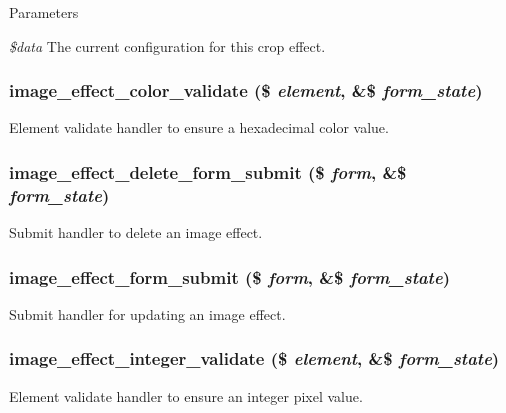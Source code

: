 \begin{DoxyParams}{Parameters}
\item[{\em \$data}]The current configuration for this crop effect. \end{DoxyParams}
\hypertarget{image_8admin_8inc_a2c063ffc86288da6ffc7ff2aa1fe5248}{
\subsubsection[{image\_\-effect\_\-color\_\-validate}]{\setlength{\rightskip}{0pt plus 5cm}image\_\-effect\_\-color\_\-validate (\$ {\em element}, \/  \&\$ {\em form\_\-state})}}
\label{image_8admin_8inc_a2c063ffc86288da6ffc7ff2aa1fe5248}
Element validate handler to ensure a hexadecimal color value. \hypertarget{image_8admin_8inc_aa77e4be504f72cab81b144a57a377427}{
\subsubsection[{image\_\-effect\_\-delete\_\-form\_\-submit}]{\setlength{\rightskip}{0pt plus 5cm}image\_\-effect\_\-delete\_\-form\_\-submit (\$ {\em form}, \/  \&\$ {\em form\_\-state})}}
\label{image_8admin_8inc_aa77e4be504f72cab81b144a57a377427}
Submit handler to delete an image effect. \hypertarget{image_8admin_8inc_aab999018d03bcbfde679bb79edcb4e34}{
\subsubsection[{image\_\-effect\_\-form\_\-submit}]{\setlength{\rightskip}{0pt plus 5cm}image\_\-effect\_\-form\_\-submit (\$ {\em form}, \/  \&\$ {\em form\_\-state})}}
\label{image_8admin_8inc_aab999018d03bcbfde679bb79edcb4e34}
Submit handler for updating an image effect. \hypertarget{image_8admin_8inc_a021d1b2c5b893b7c59098ee07e12cfec}{
\subsubsection[{image\_\-effect\_\-integer\_\-validate}]{\setlength{\rightskip}{0pt plus 5cm}image\_\-effect\_\-integer\_\-validate (\$ {\em element}, \/  \&\$ {\em form\_\-state})}}
\label{image_8admin_8inc_a021d1b2c5b893b7c59098ee07e12cfec}
Element validate handler to ensure an integer pixel value.

